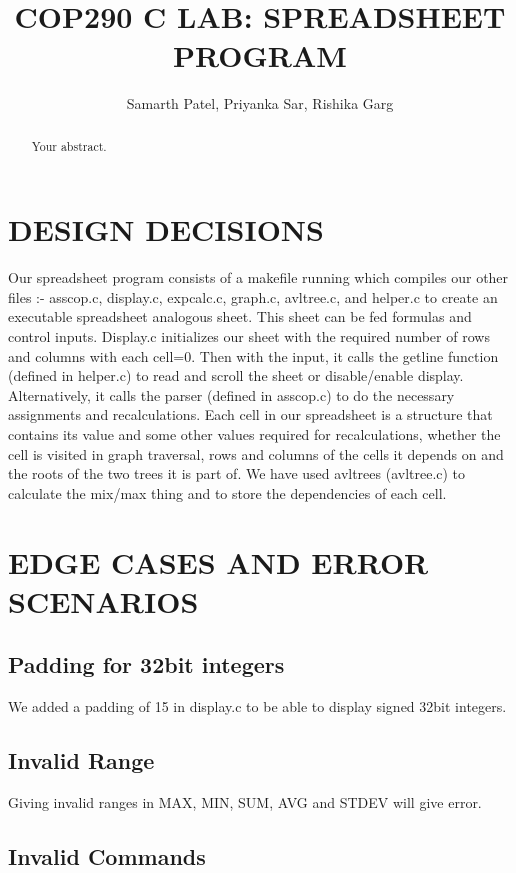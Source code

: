 \documentclass[a4paper]{article}
\title{COP290 C LAB: SPREADSHEET PROGRAM}
\author{Samarth Patel, Priyanka Sar, Rishika Garg}
\begin{document}
\maketitle

\begin{abstract}
Your abstract.
\end{abstract}

\section{DESIGN DECISIONS}

Our spreadsheet program consists of a makefile running which compiles our other files :- asscop.c, display.c, expcalc.c, graph.c, avltree.c, and helper.c to create an executable spreadsheet analogous sheet. This sheet can be fed formulas and control inputs. Display.c initializes our sheet with the required number of rows and columns with each cell=0. Then with the input, it calls the getline function (defined in helper.c) to read and scroll the sheet or disable/enable display. Alternatively, it calls the parser (defined in asscop.c) to do the necessary assignments and recalculations. Each cell in our spreadsheet is a structure that contains its value and some other values required for recalculations, whether the cell is visited in graph traversal, rows and columns of the cells it depends on and the roots of the two trees it is part of. We have used avltrees (avltree.c) to calculate the mix/max thing and to store the dependencies of each cell. 

\section{EDGE CASES AND ERROR SCENARIOS}

\subsection{Padding for 32bit integers}

We added a padding of 15 in display.c to be able to display signed 32bit integers.

\subsection{Invalid Range}

Giving invalid ranges  in MAX, MIN, SUM, AVG and STDEV will give error.

\subsection{Invalid Commands}
\end{document}
